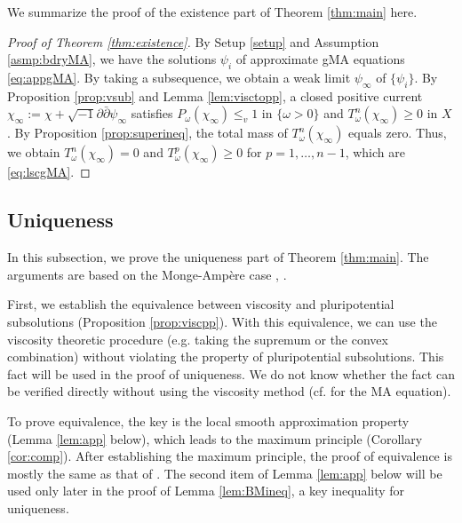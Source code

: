 \documentclass{amsart}
\numberwithin{equation}{section}
\theoremstyle{plain}
\theoremstyle{definition}
\theoremstyle{remark}
\newcommand{\delb}{\sqrt{-1}\partial\bar{\partial}}
\begin{document}
We summarize the proof of the existence part of Theorem \ref{thm:main} here.

\begin{proof}[Proof of Theorem \ref{thm:existence}]
    By Setup \ref{setup} and Assumption \ref{asmp:bdryMA}, we have the solutions $\psi_i$ of approximate gMA equations \eqref{eq:appgMA}. By taking a subsequence, we obtain a weak limit $\psi_\infty$ of $\{\psi_i\}$. By Proposition \ref{prop:vsub} and Lemma \ref{lem:visctopp}, a closed positive current $\chi_\infty:=\chi+\delb\psi_\infty$ satisfies $P_\omega(\chi_\infty)\le_v1$ in $\{\omega>0\}$ and $T^n_{\omega}(\chi_\infty)\ge0$ in $X$. 
    By Proposition \ref{prop:superineq}, the total mass of $T^n_\omega(\chi_\infty)$ equals zero. Thus, we obtain $T^n_\omega(\chi_\infty)=0$ and $T^p_\omega(\chi_\infty)\ge0$ for $p=1,\dots, n-1$, which are \eqref{eq:lscgMA}. 
\end{proof}

\subsection{Uniqueness}\label{subsec:uniqueness}

In this subsection, we prove the uniqueness part of Theorem \ref{thm:main}. The arguments are based on the Monge-Ampère case \cite[Section 3]{BEGZ}, \cite{Dinew}.

First, we establish the equivalence between viscosity and pluripotential subsolutions (Proposition \ref{prop:viscpp}). With this equivalence, we can use the viscosity theoretic procedure (e.g. taking the supremum or the convex combination) without violating the property of pluripotential subsolutions. This fact will be used in the proof of uniqueness. We do not know whether the fact can be verified directly without using the viscosity method (cf. \cite[Corollary 1.10]{GZ} for the MA equation). 

To prove equivalence, the key is the local smooth approximation property (Lemma \ref{lem:app} below), which leads to the maximum principle (Corollary \ref{cor:comp}). After establishing the maximum principle,  the proof of equivalence is mostly the same as that of \cite[Propositions 1.5 and 1.11]{EGZ}.
The second item of Lemma \ref{lem:app} below will be used only later in the proof of Lemma \ref{lem:BMineq}, a key inequality for uniqueness.
\end{document}
